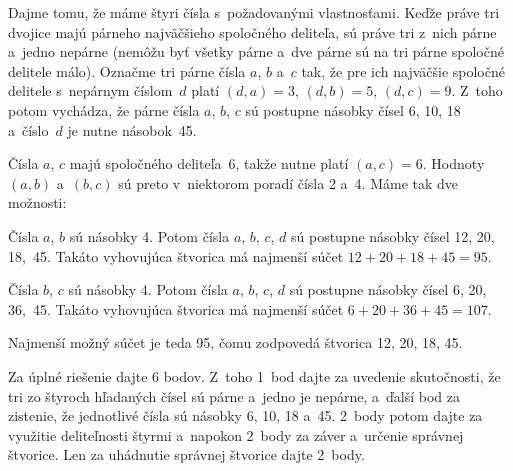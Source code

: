 {%
Dajme tomu, že máme štyri čísla s~požadovanými vlastnosťami.
Keďže práve tri dvojice majú párneho najväčšieho spoločného deliteľa,
sú práve tri z~nich párne a~jedno nepárne (nemôžu byť
všetky párne a~dve párne sú na tri párne spoločné delitele málo).
Označme tri párne čísla $a$, $b$ a~$c$
tak, že pre ich najväčšie spoločné delitele s~nepárnym číslom~$d$ platí
$(d, a) = 3$, $(d, b) = 5$, $(d, c) = 9$. Z~toho potom vychádza,
že párne čísla $a$, $b$, $c$ sú postupne násobky čísel 6, 10, 18
a~číslo~$d$ je nutne násobok~45.

Čísla $a$, $c$ majú spoločného deliteľa~6, takže nutne platí
$(a, c) = 6$. Hodnoty $(a, b)$ a~$(b, c)$ sú preto v~niektorom poradí
čísla 2 a~4.
Máme tak dve možnosti:

Čísla $a$, $b$ sú násobky 4. Potom čísla $a$, $b$, $c$, $d$ sú postupne násobky
čísel 12, 20, 18,~45. Takáto vyhovujúca štvorica má najmenší súčet
${12 + 20 + 18 + 45 = 95}$.

Čísla $b$, $c$ sú násobky 4. Potom čísla $a$, $b$, $c$, $d$ sú postupne násobky
čísel 6, 20, 36,~45. Takáto vyhovujúca štvorica má najmenší súčet
$6 + 20 + 36 + 45 = 107$.

Najmenší možný súčet je teda 95, čomu zodpovedá štvorica 12, 20, 18, 45.




\nobreak\medskip\petit\noindent
Za úplné riešenie dajte 6 bodov.
Z~toho 1~bod dajte za uvedenie skutočnosti, že tri zo štyroch hľadaných čísel sú párne
a~jedno je nepárne,
a~ďalší bod za zistenie, že jednotlivé čísla sú násobky 6, 10, 18 a~45.
2~body potom dajte za využitie deliteľnosti štyrmi a~napokon 2~body za záver
a~určenie správnej štvorice.
Len za uhádnutie správnej štvorice dajte 2~body.
\endpetit
\bigbreak
}

